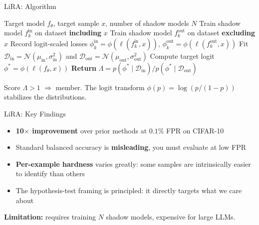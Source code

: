 \documentclass[10pt, aspectratio=169]{beamer}
\begin{document}
\begin{frame}{LiRA: Algorithm}
  \begin{algorithmic}[1]
    \Require Target model $f_\theta$, target sample $x$, number of shadow models $N$
      \State Train shadow model $f_k^{\mathrm{in}}$ on dataset \textbf{including} $x$
      \State Train shadow model $f_k^{\mathrm{out}}$ on dataset \textbf{excluding} $x$
      \State Record logit-scaled losses $\phi_k^{\mathrm{in}} = \phi(\ell(f_k^{\mathrm{in}}, x))$,
             $\phi_k^{\mathrm{out}} = \phi(\ell(f_k^{\mathrm{out}}, x))$
    \EndFor
    \State Fit $\mathcal{D}_{\mathrm{in}} = \mathcal{N}(\mu_{\mathrm{in}}, \sigma_{\mathrm{in}}^2)$ and
           $\mathcal{D}_{\mathrm{out}} = \mathcal{N}(\mu_{\mathrm{out}}, \sigma_{\mathrm{out}}^2)$
    \State Compute target logit $\phi^* = \phi(\ell(f_\theta, x))$
    \State \textbf{Return} $\Lambda = p(\phi^* \mid \mathcal{D}_{\mathrm{in}}) / p(\phi^* \mid \mathcal{D}_{\mathrm{out}})$
  \end{algorithmic}
  \vspace{4pt}
  Score $\Lambda > 1$ $\Rightarrow$ member. The logit transform $\phi(p) = \log(p/(1-p))$ stabilizes the distributions.
\end{frame}

\begin{frame}{LiRA: Key Findings}
  \begin{itemize}
    \item \textbf{10$\times$ improvement} over prior methods at $0.1\%$ FPR on CIFAR-10
    \item Standard balanced accuracy is \textbf{misleading}, you must evaluate at low FPR
    \item \textbf{Per-example hardness} varies greatly: some samples are intrinsically easier to identify than others
    \item The hypothesis-test framing is principled: it directly targets what we care about
  \end{itemize}
  \vspace{8pt}
  \textbf{Limitation:} requires training $N$ shadow models, expensive for large LLMs.
\end{frame}

\end{document}

